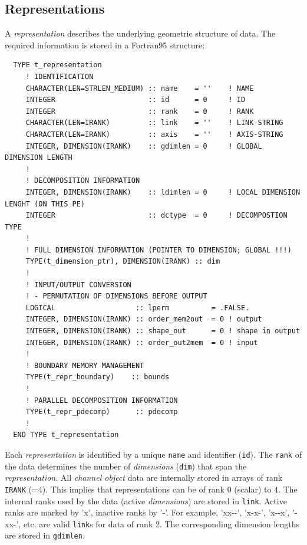 \documentclass[twoside]{article}
\begin{document}
\subsection{Representations}
\label{sec:repr}

A {\it representation} describes the underlying geometric structure of data.
The required information is stored in a Fortran95 structure:

\begin{verbatim}
  TYPE t_representation
     ! IDENTIFICATION
     CHARACTER(LEN=STRLEN_MEDIUM) :: name    = ''    ! NAME
     INTEGER                      :: id      = 0     ! ID
     INTEGER                      :: rank    = 0     ! RANK
     CHARACTER(LEN=IRANK)         :: link    = ''    ! LINK-STRING
     CHARACTER(LEN=IRANK)         :: axis    = ''    ! AXIS-STRING
     INTEGER, DIMENSION(IRANK)    :: gdimlen = 0     ! GLOBAL DIMENSION LENGTH
     !
     ! DECOMPOSITION INFORMATION
     INTEGER, DIMENSION(IRANK)    :: ldimlen = 0     ! LOCAL DIMENSION LENGHT (ON THIS PE)
     INTEGER                      :: dctype  = 0     ! DECOMPOSTION TYPE
     !
     ! FULL DIMENSION INFORMATION (POINTER TO DIMENSION; GLOBAL !!!)
     TYPE(t_dimension_ptr), DIMENSION(IRANK) :: dim
     !
     ! INPUT/OUTPUT CONVERSION
     ! - PERMUTATION OF DIMENSIONS BEFORE OUTPUT
     LOGICAL                   :: lperm          = .FALSE.
     INTEGER, DIMENSION(IRANK) :: order_mem2out  = 0 ! output
     INTEGER, DIMENSION(IRANK) :: shape_out      = 0 ! shape in output
     INTEGER, DIMENSION(IRANK) :: order_out2mem  = 0 ! input
     !
     ! BOUNDARY MEMORY MANAGEMENT
     TYPE(t_repr_boundary)    :: bounds
     !
     ! PARALLEL DECOMPOSITION INFORMATION
     TYPE(t_repr_pdecomp)      :: pdecomp
     !
  END TYPE t_representation
\end{verbatim}

Each {\it representation} is identified by a unique {\tt name} and identifier
({\tt id}). The {\tt rank} of the data determines the number of {\it
dimensions} ({\tt dim}) that span the {\it representation}.
All {\it channel object} data are
internally stored in arrays of rank {\tt IRANK} (=4).  This implies that
representations can be of rank 0 (scalar) to 4. The internal ranks used by the
data (active {\it dimensions}) are stored in {\tt link}. Active ranks are
marked by 'x', inactive ranks by '-'. For example, 'xx{-}{-}', 'x-x-',
'x{-}{-}x', '-xx-', etc. are valid {\tt link}s for data of rank 2.  The
corresponding dimension lengths are stored in {\tt gdimlen}.
\end{document}
